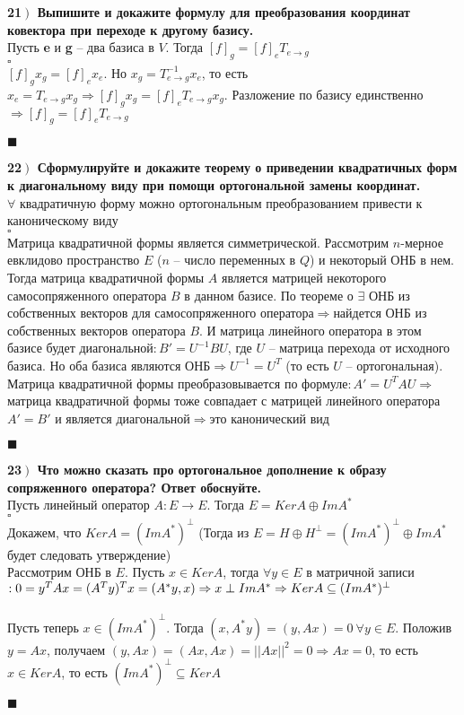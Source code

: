 \documentclass[a4paper,12pt]{article}
\begin{document}
    \textbf{21$\left.\right)$ Выпишите и докажите формулу для преобразования координат ковектора при переходе к другому базису.}\\
    Пусть \textbf{e} и \textbf{g} -- два базиса в $V$. Тогда $[f]_g=[f]_eT_{e\rightarrow g}$\\
    $\square$\\
    $[f]_gx_g=[f]_ex_e$. Но $x_g=T_{e\rightarrow g}^{-1}x_e$, то есть $x_e=T_{e\rightarrow g}x_g\Rightarrow[f]_gx_g=[f]_eT_{e\rightarrow g}x_g$. Разложение по базису единственно$\Rightarrow[f]_g=[f]_eT_{e\rightarrow g}$
    \begin{flushright}
        $\blacksquare$
    \end{flushright}

    \textbf{22$\left.\right)$ Сформулируйте и докажите теорему о приведении квадратичных форм к диагональному виду при помощи ортогональной замены координат.}\\
    $\forall$ квадратичную форму можно ортогональным преобразованием привести к каноническому виду\\
    $\square$\\
    Матрица квадратичной формы является симметрической. Рассмотрим $n$-мерное евклидово пространство $E$ ($n$ -- число переменных в $Q$) и некоторый ОНБ в нем. Тогда матрица квадратичной формы $A$ является матрицей некоторого самосопряженного оператора $B$ в данном базисе. По теореме о $\exists$ ОНБ из собственных векторов для самосопряженного оператора$\Rightarrow$найдется ОНБ из собственных векторов оператора $B$. И матрица линейного оператора в этом базисе будет диагональной$: B'=U^{-1}BU$, где $U$ -- матрица перехода от исходного базиса. Но оба базиса являются ОНБ$\Rightarrow U^{-1}=U^T$ (то есть $U$ -- ортогональная). Матрица квадратичной формы преобразовывается по формуле$: A'=U^TAU\Rightarrow$матрица квадратичной формы тоже совпадает с матрицей линейного оператора $A'=B'$ и является диагональной$\Rightarrow$это канонический вид
    \begin{flushright}
        $\blacksquare$
    \end{flushright}

    \textbf{23$\left.\right)$ Что можно сказать про ортогональное дополнение к образу сопряженного оператора? Ответ обоснуйте.}\\
    Пусть линейный оператор $A:E\rightarrow E$. Тогда $E=KerA\oplus ImA^*$\\
    $\square$\\
    Докажем, что $KerA=(ImA^*)^\perp$ (Тогда из $E=H\oplus H^\perp=(ImA^*)^\perp\oplus ImA^*$ будет следовать утверждение)\\
    Рассмотрим ОНБ в $E$. Пусть $x\in KerA$, тогда $\forall y\in E$ в матричной записи$:\\ 0=y^TAx=(A^Ty)^Tx=(A^*y, x)\Rightarrow x\perp ImA^*\Rightarrow KerA\subseteq(ImA^*)^\perp$\\\\
    Пусть теперь $x\in (ImA^*)^\perp$. Тогда $(x, A^*y)=(y, Ax)=0\ \forall y\in E$. Положив $y=Ax$, получаем $(y, Ax)=(Ax, Ax)=||Ax||^2=0\Rightarrow Ax=0$, то есть $x\in KerA$, то есть $(ImA^*)^\perp\subseteq KerA$
    \begin{flushright}
        $\blacksquare$
    \end{flushright}
\end{document}
